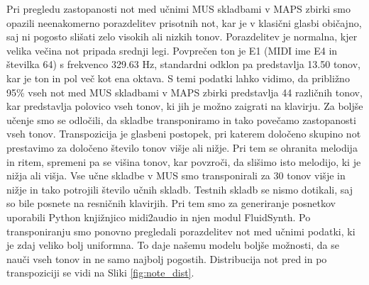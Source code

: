 \documentclass[a4paper, 12pt, openright]{book}
\begin{document}
Pri pregledu zastopanosti not med učnimi MUS skladbami v MAPS zbirki smo opazili neenakomerno porazdelitev prisotnih not, kar je v klasični glasbi običajno, saj ni pogosto slišati zelo visokih ali nizkih tonov.
Porazdelitev je normalna, kjer velika večina not pripada srednji legi.
Povprečen ton je E1 (MIDI ime E4 in številka 64) s frekvenco 329.63 Hz, standardni odklon pa predstavlja 13.50 tonov, kar je ton in pol več kot ena oktava.
S temi podatki lahko vidimo, da približno 95\% vseh not med MUS skladbami v MAPS zbirki predstavlja 44 različnih tonov, kar predstavlja polovico vseh tonov, ki jih je možno zaigrati na klavirju.
Za boljše učenje smo se odločili, da skladbe transponiramo in tako povečamo zastopanosti vseh tonov.
Transpozicija je glasbeni postopek, pri katerem določeno skupino not prestavimo za določeno število tonov višje ali nižje.
Pri tem se ohranita melodija in ritem, spremeni pa se višina tonov, kar povzroči, da slišimo isto melodijo, ki je nižja ali višja.
Vse učne skladbe v MUS smo transponirali za 30 tonov višje in nižje in tako potrojili število učnih skladb. Testnih skladb se nismo dotikali, saj so bile posnete na resničnih klavirjih.
Pri tem smo za generiranje posnetkov uporabili Python knjižnjico {\sf midi2audio} in njen modul {\sf FluidSynth}.
Po transponiranju smo ponovno pregledali porazdelitev not med učnimi podatki, ki je zdaj veliko bolj uniformna. To daje našemu modelu boljše možnosti, da se nauči vseh tonov in ne samo najbolj pogostih. Distribucija not pred in po transpoziciji se vidi na Sliki \ref{fig:note_dist}.
\end{document}
